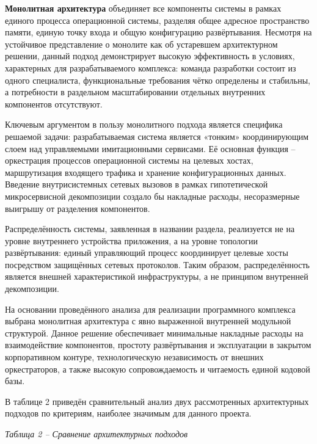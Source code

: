 \documentclass[
]{article}
\begin{document}
\textbf{Монолитная архитектура} объединяет все компоненты системы в
рамках единого процесса операционной системы, разделяя общее адресное
пространство памяти, единую точку входа и общую конфигурацию
развёртывания. Несмотря на устойчивое представление о монолите как об
устаревшем архитектурном решении, данный подход демонстрирует высокую
эффективность в условиях, характерных для разрабатываемого комплекса:
команда разработки состоит из одного специалиста, функциональные
требования чётко определены и стабильны, а потребности в раздельном
масштабировании отдельных внутренних компонентов отсутствуют.

Ключевым аргументом в пользу монолитного подхода является специфика
решаемой задачи: разрабатываемая система является «тонким»
координирующим слоем над управляемыми имитационными сервисами. Её
основная функция -- оркестрация процессов операционной системы на
целевых хостах, маршрутизация входящего трафика и хранение
конфигурационных данных. Введение внутрисистемных сетевых вызовов в
рамках гипотетической микросервисной декомпозиции создало бы накладные
расходы, несоразмерные выигрышу от разделения компонентов.

Распределённость системы, заявленная в названии раздела, реализуется не
на уровне внутреннего устройства приложения, а на уровне топологии
развёртывания: единый управляющий процесс координирует целевые хосты
посредством защищённых сетевых протоколов. Таким образом,
распределённость является внешней характеристикой инфраструктуры, а не
принципом внутренней декомпозиции.

На основании проведённого анализа для реализации программного комплекса
выбрана монолитная архитектура с явно выраженной внутренней модульной
структурой. Данное решение обеспечивает минимальные накладные расходы на
взаимодействие компонентов, простоту развёртывания и эксплуатации в
закрытом корпоративном контуре, технологическую независимость от внешних
оркестраторов, а также высокую сопровождаемость и читаемость единой
кодовой базы.

В таблице 2 приведён сравнительный анализ двух рассмотренных
архитектурных подходов по критериям, наиболее значимым для данного
проекта.

\emph{Таблица 2 -- Сравнение архитектурных подходов}
\end{document}
